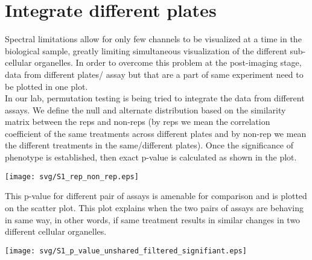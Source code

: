 \documentclass[12pt]{article}
\begin{document}
\section{Integrate different plates}
Spectral limitations allow for only few channels to be visualized at a time in the biological sample, greatly limiting simultaneous visualization of the different sub-cellular organelles. In order to overcome this problem at the post-imaging stage, data from different plates/ assay but that are a part of same experiment need to be plotted in one plot.\\
In our lab, permutation testing is being tried to integrate the data from different assays. We define the null  and alternate distribution based on the similarity matrix between the reps and non-reps (by reps we mean the correlation coefficient of the same treatments across different plates and by non-rep we mean the different treatments in the same/different plates). Once the significance of phenotype is established, then exact p-value is calculated as shown in the plot. 
	\begin{center} \texttt{[image: svg/S1\_rep\_non\_rep.eps]} \end{center}	
This p-value for different pair of assays is amenable for comparison and is plotted on the scatter plot. This plot explains when the two pairs of assays are behaving in same way, in other words, if same treatment results in similar changes in two different cellular organelles. 
	\begin{center} \texttt{[image: svg/S1\_p\_value\_unshared\_filtered\_signifiant.eps]} \end{center}	
\end{document}

